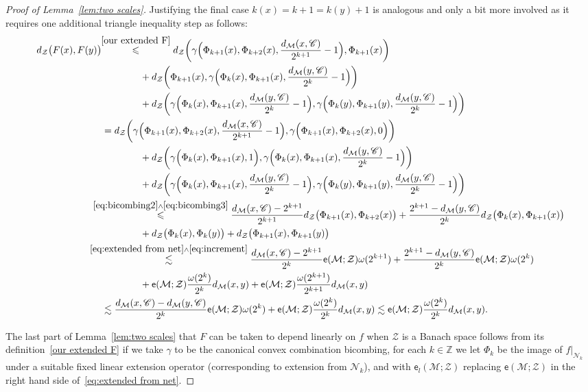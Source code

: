 \documentclass[11pt,reqno]{amsart}
\newcommand{\Z}{\mathbb{Z}}
\renewcommand{\le}{\leqslant}
\newcommand{\ee}{\mathsf{e}}
\newcommand{\cZ}{\mathcal{Z}}
\newcommand{\NN}{\mathcal{N}}
\newcommand{\MM}{\mathcal{M}}
\newcommand{\sub}{\mathscr{C}}
\begin{document}
\begin{proof}[Proof of Lemma~\ref{lem:two scales}]
Justifying the final case  $k(x)=k+1=k(y)+1$ is analogous and only a bit more involved as it requires  one additional triangle inequality step as follows:
\begin{align*}
d_\cZ\big(F(x),F(y)\big) &\!\!\stackrel{\eqref{our extended F}}{\le} d_\cZ\bigg(\gamma\Big(\Phi_{k+1}(x),\Phi_{k +2}(x),\frac{d_\MM(x,\sub)}{2^{k+1}}-1\Big),\Phi_{k+1}(x)\bigg)\\&\qquad\qquad+d_\cZ\bigg(\Phi_{k+1}(x),\gamma\Big(\Phi_{k}(x),\Phi_{k +1}(x),\frac{d_\MM(y,\sub)}{2^{k}}-1\Big)\bigg)\\&\qquad\qquad +d_\cZ\bigg(\gamma\Big(\Phi_{k}(x),\Phi_{k +1}(x),\frac{d_\MM(y,\sub)}{2^{k}}-1\Big),\gamma\Big(\Phi_{k}(y),\Phi_{k +1}(y),\frac{d_\MM(y,\sub)}{2^{k}}-1\Big)\bigg)\\
&=d_\cZ\bigg(\gamma\Big(\Phi_{k+1}(x),\Phi_{k+2}(x),\frac{d_\MM(x,\sub)}{2^{k+1}}-1\Big),\gamma\Big(\Phi_{k+1}(x),\Phi_{k+2}(x),0\Big)\bigg)
\\&\qquad\qquad+d_\cZ\bigg(\gamma\Big(\Phi_{k}(x),\Phi_{k +1}(x),1\Big),\gamma\Big(\Phi_{k}(x),\Phi_{k +1}(x),\frac{d_\MM(y,\sub)}{2^{k}}-1\Big)\bigg)\\&\qquad\qquad +d_\cZ\bigg(\gamma\Big(\Phi_{k}(x),\Phi_{k +1}(x),\frac{d_\MM(y,\sub)}{2^{k}}-1\Big),\gamma\Big(\Phi_{k}(y),\Phi_{k +1}(y),\frac{d_\MM(y,\sub)}{2^{k}}-1\Big)\bigg)\\
&\!\!\!\!\!\!\!\stackrel{\eqref{eq:bicombing2}\wedge\eqref{eq:bicombing3}}{\le} \frac{d_\MM(x,\sub)-2^{k+1}}{2^{k+1}}d_\cZ\big(\Phi_{k+1}(x),\Phi_{k+2}(x)\big)+\frac{2^{k+1}-d_\MM(y,\sub)}{2^{k}}
d_\cZ\big(\Phi_{k}(x),\Phi_{k+1}(x)\big)
\\ &\qquad\qquad+d_\cZ\big(\Phi_k(x),\Phi_k(y)\big)+
d_\cZ\big(\Phi_{k+1}(x),\Phi_{k+1}(y)\big)\\&\!\!\!\!\!\!\!\!\!\stackrel{\eqref{eq:extended from net}\wedge \eqref{eq:increment}}{\lesssim}
\frac{d_\MM(x,\sub)-2^{k+1}}{2^k}\ee(\MM;\cZ)\omega(2^{k+1})+\frac{2^{k+1}-d_\MM(y,\sub)}{2^k}\ee(\MM;\cZ)\omega(2^{k})\\&\qquad\qquad +
\ee(\MM;\cZ)\frac{\omega(2^k)}{2^k}d_\MM(x,y)+\ee(\MM;\cZ)\frac{\omega(2^{k+1})}{2^{k+1}}d_\MM(x,y)\\&\lesssim 
\frac{d_\MM(x,\sub)-d_\MM(y,\sub)}{2^k}\ee(\MM;\cZ)\omega(2^{k})+\ee(\MM;\cZ)\frac{\omega(2^k)}{2^k}d_\MM(x,y)\lesssim \ee(\MM;\cZ)\frac{\omega(2^k)}{2^k}d_\MM(x,y).
\end{align*}

The last part of Lemma~\ref{lem:two scales} that $F$ can be taken to depend linearly on $f$ when $\cZ$ is a Banach space follows  from its definition~\eqref{our extended F} if we take $\gamma$ to be the canonical convex combination bicombing,  for each $k\in \Z$ we let $\Phi_k$ be the image of $f|_{\NN_k}$ under a suitable fixed linear extension operator (corresponding to extension from $\NN_k$), and with $\ee_l(\MM;\cZ)$ replacing $\ee(\MM;\cZ)$ in the right hand side of~\eqref{eq:extended from net}.    
\end{proof}
\end{document}
